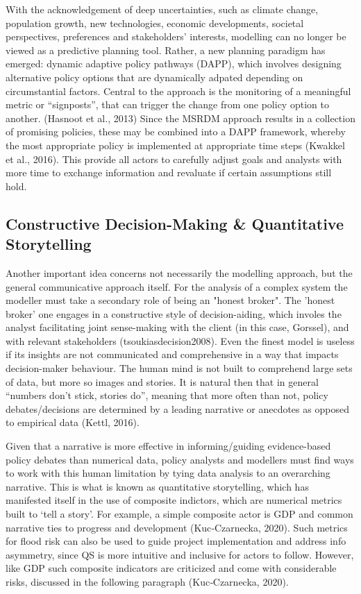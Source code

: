 With the acknowledgement of deep uncertainties, such as climate change, population growth, new technologies, economic developments, societal perspectives, preferences and stakeholders’ interests, modelling can no longer be viewed as a predictive planning tool. Rather, a new planning paradigm has emerged: dynamic adaptive policy pathways (DAPP), which involves designing alternative policy options that are dynamically adpated depending on circumstantial factors. Central to the approach is the monitoring of a meaningful metric or “signposts”, that can trigger the change from one policy option to another. (Hasnoot et al., 2013) Since the MSRDM approach results in a collection of promising policies, these may be combined into a DAPP framework, whereby the most appropriate policy is implemented at appropriate time steps (Kwakkel et al., 2016). This provide all actors to carefully adjust goals and analysts with more time to exchange information and revaluate if certain assumptions still hold. 

\subsection{Constructive Decision-Making & Quantitative Storytelling}

Another important idea concerns not necessarily the modelling approach, but the general communicative approach itself. For the analysis of a complex system the modeller must take a secondary role of being an "honest broker". The 'honest broker' one engages in a constructive style of decision-aiding, which involes the analyst facilitating joint sense-making with the client (in this case, Gorssel), and with relevant stakeholders (tsoukiasdecision2008). Even the finest model is useless if its insights are not communicated and comprehensive in a way that impacts decision-maker behaviour. The human mind is not built to comprehend large sets of data, but more so images and stories. It is natural then that in general “numbers don’t stick, stories do”, meaning that more often than not, policy debates/decisions are determined by a leading narrative or anecdotes as opposed to empirical data (Kettl, 2016).  

Given that a narrative is more effective in informing/guiding evidence-based policy debates than numerical data, policy analysts and modellers must find ways to work with this human limitation by tying data analysis to an overarching narrative. This is what is known as quantitative storytelling, which has manifested itself in the use of composite indictors, which are numerical metrics built to ‘tell a story’. For example, a simple composite actor is GDP and common narrative ties to progress and development (Kuc‑Czarnecka, 2020). Such metrics for flood risk can also be used to guide project implementation and address info asymmetry, since QS is more intuitive and inclusive for actors to follow. However, like GDP such composite indicators are criticized and come with considerable risks, discussed in the following paragraph (Kuc‑Czarnecka, 2020).

